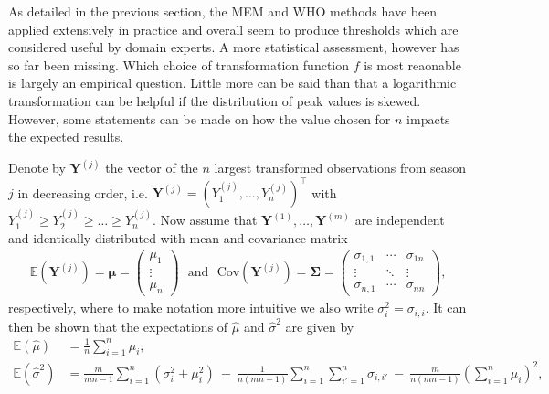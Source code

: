 \documentclass{article}
\begin{document}
As detailed in the previous section, the MEM and WHO methods have been applied extensively in practice and overall seem to produce thresholds which are considered useful by domain experts. A more statistical assessment, however has so far been missing. Which choice of transformation function $f$ is most reaonable is largely an empirical question. Little more can be said than that a logarithmic transformation can be helpful if the distribution of peak values is skewed. However, some statements can be made on how the value chosen for $n$ impacts the expected results.

Denote by $\mathbf{Y}^{(j)}$ the vector of the $n$ largest transformed observations from season $j$ in decreasing order, i.e. $\mathbf{Y}^{(j)} = (Y^{(j)}_1, \dots, Y^{(j)}_n)^\top$ with $Y^{(j)}_1 \geq Y^{(j)}_2 \geq \dots \geq Y^{(j)}_n$. Now assume that $\mathbf{Y}^{(1)}, \dots, \mathbf{Y}^{(m)}$ are independent and identically distributed with mean and covariance matrix
\begin{align}
\mathbb{E}\left(\mathbf{Y}^{(j)}\right) = \boldsymbol{\mu} = \left(\begin{array}{c}
\mu_1\\
\vdots\\
\mu_n
\end{array}\right) \ \ \ \text{and} \ \ \ \text{Cov}\left(\mathbf{Y}^{(j)}\right) = \boldsymbol{\Sigma} =
\left(\begin{array}{ccc}
\sigma_{1, 1} & \cdots & \sigma_{1n}\\
\vdots & \ddots &\vdots\\
\sigma_{n, 1} & \cdots & \sigma_{nn}
\end{array}\right),
\end{align}
respectively, where to make notation more intuitive we also write $\sigma^2_i = \sigma_{i, i}$. It can then be shown that the expectations of $\hat\mu$ and $\hat{\sigma}^2$ are given by
\begin{align}
\mathbb{E}(\hat{\mu}) & = \frac{1}{n} \sum_{i = 1}^n \mu_i,
\label{eq:expectation_mu}\\
\mathbb{E}(\hat{\sigma}^2) & = \frac{m}{mn - 1} \sum_{i = 1}^n (\sigma_{i}^2 + \mu_i^2) \ - \ \frac{1}{n(mn - 1)} \sum_{i = 1}^n \sum_{i' = 1}^n \sigma_{i,i'} \ - \ \frac{m}{n(mn - 1)}\left(\sum_{i = 1}^n \mu_i\right)^2,
\label{eq:expectation_sigma2}
\end{align}
\end{document}
